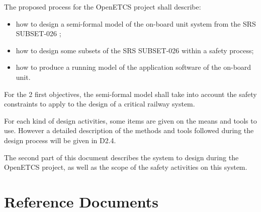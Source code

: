The proposed process for the OpenETCS project shall describe:
\begin{itemize}
\item how to design a semi-formal model of the on-board unit system from the SRS SUBSET-026 ;
\item how to design some subsets of the SRS SUBSET-026 within a safety process;
\item how to produce a running model of the application software of the on-board unit.
\end{itemize}

For the 2 first objectives, the semi-formal  model  shall take into account the safety constraints to apply to the design of a critical railway system.

For each kind of design activities, some items are given on the means and tools to  use. However a detailed description of the methods and tools followed during the design process will be given in D2.4.

The second part of this document describes the system to design during the OpenETCS project, as well as the scope of the safety activities on this system.


\section{Reference Documents}



\nocite{*}


%



